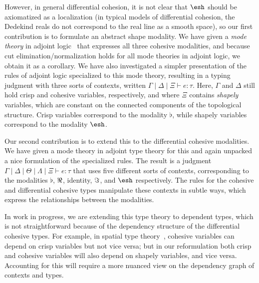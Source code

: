 \documentclass{article}
\begin{document}
However, in general differential cohesion, it is not clear that $\shape$
should be axiomatized as a localization (in typical models of
differential cohesion, the Dedekind reals do not correspond to the real
line as a smooth space), so our first contribution is to formulate an
abstract shape modality.  We have given a \emph{mode theory} in adjoint
logic~\citep{Licata2017} that expresses all three cohesive modalities,
and because cut elimination/normalization holds for all mode theories in
adjoint logic, we obtain it as a corollary.  We have also investigated a
simpler presentation of the rules of adjoint logic specialized to this
mode theory, resulting in a typing judgment with three sorts of
contexts, written $\Gamma \mid \Delta \mid \Xi \vdash e : \tau$.  Here,
$\Gamma$ and $\Delta$ still hold crisp and cohesive variables,
respectively, and where $\Xi$ contains \emph{shapely} variables, which
are constant on the connected components of the topological structure.
Crisp variables correspond to the modality $\flat$, while shapely
variables correspond to the modality $\shape$.

Our second contribution is to extend this to the differential cohesive
modalities.  We have given a mode theory in adjoint type theory for this
and again unpacked a nice formulation of the specialized rules.  The
result is a judgment $\Gamma \mid \Delta \mid \Theta \mid \Lambda \mid
\Xi \vdash e : \tau$ that uses five different sorts of contexts,
corresponding to the modalities $\flat$, $\Re$, identity, $\Im$, and
$\shape$ respectively.  The rules for the cohesive and differential
cohesive types manipulate these contexts in subtle ways, which express
the relationships between the modalities.

In work in progress, we are extending this type theory to dependent
types, which is not straightforward because of the dependency structure
of the differential cohesive types.  For example, in spatial type
theory~\citep{Shulman2015}, cohesive variables can depend on crisp
variables but not vice versa; but in our reformulation both crisp and
cohesive variables will also depend on shapely variables, and vice
versa.  Accounting for this will require a more nuanced view on the
dependency graph of contexts and types.

\end{document}
